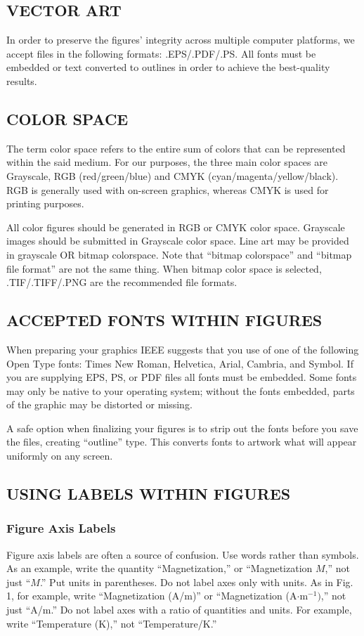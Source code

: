 \documentclass{IEEEoj}
\begin{document}
\subsection{VECTOR ART}
In order to preserve the figures' integrity across multiple computer 
platforms, we accept files in the following formats: .EPS/.PDF/.PS. All 
fonts must be embedded or text converted to outlines in order to achieve the 
best-quality results.

\subsection{COLOR SPACE}
The term color space refers to the entire sum of colors that can be 
represented within the said medium. For our purposes, the three main color 
spaces are Grayscale, RGB (red/green/blue) and CMYK 
(cyan/magenta/yellow/black). RGB is generally used with on-screen graphics, 
whereas CMYK is used for printing purposes.

All color figures should be generated in RGB or CMYK color space. Grayscale 
images should be submitted in Grayscale color space. Line art may be 
provided in grayscale OR bitmap colorspace. Note that ``bitmap colorspace'' 
and ``bitmap file format'' are not the same thing. When bitmap color space 
is selected, .TIF/.TIFF/.PNG are the recommended file formats.

\subsection{ACCEPTED FONTS WITHIN FIGURES}
When preparing your graphics IEEE suggests that you use of one of the 
following Open Type fonts: Times New Roman, Helvetica, Arial, Cambria, and 
Symbol. If you are supplying EPS, PS, or PDF files all fonts must be 
embedded. Some fonts may only be native to your operating system; without 
the fonts embedded, parts of the graphic may be distorted or missing.

A safe option when finalizing your figures is to strip out the fonts before 
you save the files, creating ``outline'' type. This converts fonts to 
artwork what will appear uniformly on any screen.

\subsection{USING LABELS WITHIN FIGURES}
\subsubsection{Figure Axis Labels}
Figure axis labels are often a source of confusion. Use words rather than 
symbols. As an example, write the quantity ``Magnetization,'' or 
``Magnetization $M$,'' not just ``$M$.'' Put units in parentheses. Do not label 
axes only with units. As in Fig. 1, for example, write ``Magnetization 
(A/m)'' or ``Magnetization (A$\cdot $m$^{-1})$,'' not just ``A/m.'' Do not 
label axes with a ratio of quantities and units. For example, write 
``Temperature (K),'' not ``Temperature/K.'' 
\end{document}
